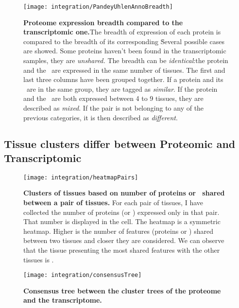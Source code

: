 \begin{figure}[!htbp]
\texttt{[image: integration/PandeyUhlenAnnoBreadth]}\centering
    \caption[Proteome expression breadth compared to the transcriptomic one]{\label{fig:breadthColPandeyUhlen}\textbf{Proteome expression breadth
    compared to the transcriptomic one.}The breadth of expression of each protein
    is compared to the breadth of its corresponding \mRNA\. Several possible cases
    are showed. Some proteins haven't been found in the transcriptomic samples,
    they are \emph{unshared.}
    The breadth can be \emph{identical}:the protein and the \mRNA\ are
    expressed in the same number of tissues. The first and last three columns
    have been grouped together. If a protein and its \mRNA\ are in the same group,
    they are tagged as \emph{similar}. If the protein and the \mRNA\ are both
    expressed between 4 to 9 tissues, they are described as \emph{mixed}. If the
    pair is not belonging to any of the previous categories, it is then described
    as \emph{different}.}
\end{figure}


\subsection{Tissue clusters differ between Proteomic and Transcriptomic}
\begin{figure}[!htbp]
\texttt{[image: integration/heatmapPairs]}\centering
    \caption[Clusters of tissues based on number of proteins or \mRNAs\ shared
    between a pair of tissues]{\label{fig:heatmapPairs}\textbf{Clusters of
    tissues based on number of proteins or \mRNAs\ shared between a pair of
    tissues.} For each pair of tissues, I have collected the number of proteins
    (or \mRNAs) expressed only in that pair. That number is displayed in the
    cell. The heatmap is a symmetric heatmap. Higher is the number of features
    (proteins or \mRNAs) shared between two tissues and closer they are
    considered. We can observe that the tissue presenting the most shared features
    with the other tissues is .}
\end{figure}


\begin{figure}[!htbp]
\texttt{[image: integration/consensusTree]}\centering
    \caption[Consensus tree between the cluster trees of the proteome and the
    transcriptome]{\label{fig:consensusTree}\textbf{Consensus tree between the
    cluster trees of the proteome and the transcriptome.}}
\end{figure}

